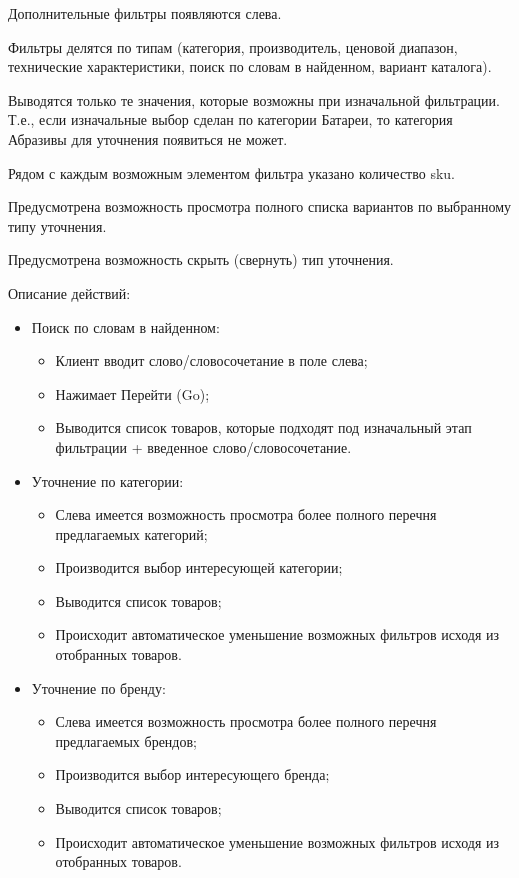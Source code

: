 {\begin{itogolong}
Дополнительные фильтры появляются слева.

Фильтры делятся по типам (категория, производитель, ценовой диапазон, технические характеристики, поиск по словам в найденном, вариант каталога).

Выводятся только те значения, которые возможны при изначальной фильтрации. Т.е., если изначальные выбор сделан по категории Батареи, то категория Абразивы для уточнения появиться не может.

Рядом с каждым возможным элементом фильтра указано количество sku.

Предусмотрена возможность просмотра полного списка вариантов по выбранному типу уточнения.

Предусмотрена возможность скрыть (свернуть) тип уточнения.

Описание действий:
\begin{itemize}
\item Поиск по словам в найденном:
	\begin{itemize}
		\item Клиент вводит слово/словосочетание в поле слева;
		\item Нажимает Перейти (Go);
		\item Выводится список товаров, которые подходят под изначальный этап фильтрации + введенное слово/словосочетание.
	\end{itemize}

\item Уточнение по категории:
	\begin{itemize}
		\item Слева имеется возможность просмотра более полного перечня предлагаемых категорий;
		\item Производится выбор интересующей категории;
		\item Выводится список товаров;
		\item Происходит автоматическое уменьшение возможных фильтров исходя из отобранных товаров.
	\end{itemize}

\item Уточнение по бренду:

	\begin{itemize}
		\item Слева имеется возможность просмотра более полного перечня предлагаемых брендов;
		\item Производится выбор интересующего бренда;
		\item Выводится список товаров;
		\item Происходит автоматическое уменьшение возможных фильтров исходя из отобранных товаров.
	\end{itemize}


\end{itemize}
\end{itogolong}}
